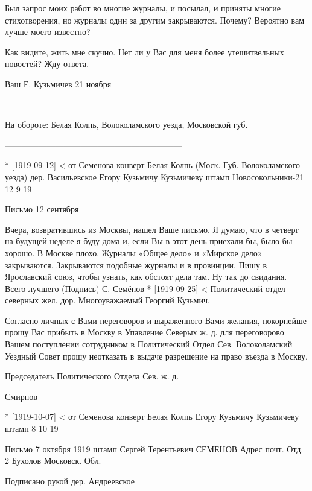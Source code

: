 Был запрос моих работ во многие журналы, и посылал, и приняты многие стихотворения, но журналы один за другим закрываются. Почему? Вероятно вам лучше моего известно?

Как видите, жить мне скучно. Нет ли у Вас для меня более утешитвельных новостей? Жду ответа.

Ваш Е. Кузьмичев 21 ноября

-

На обороте: Белая Колпь, Волоколамского уезда, Московской губ.

---------------------------------------------------------------

* [1919-09-12] < от Семенова
конверт 
Белая Колпь
(Моск. Губ. Волоколамского уезда)
дер. Васильевское
Егору Кузьмичу Кузьмичеву
штамп 
Новосокольники-21
12  9  19

Письмо
12 сентября

Вчера, возвратившись из Москвы, нашел Ваше письмо. Я думаю, что в четверг на будущей неделе я буду дома и, если Вы в этот день приехали бы, было бы хорошо.
В Москве плохо. Журналы «Общее дело» и «Мирское дело» закрываются. Закрываются подобные журналы и в провинции. Пишу в Ярославский союз, чтобы узнать, как обстоят дела там.
Ну так до свидания.
Всего лучшего
(Подпись) С. Семёнов
* [1919-09-25] < Политический отдел северных жел. дор.
Многоуважаемый Георгий Кузьмич.

Согласно личных с Вами переговоров и выраженного Вами желания, покорнейше прошу Вас прибыть в Москву в Упавление Северых ж. д. для переговорово Вашем поступлении сотрудником в Политический Отдел Сев.
Волоколамский Уездный Совет прошу неотказать в выдаче разрешение на право въезда в Москву.

Председатель Политического Отдела Сев. ж. д.

Смирнов

* [1919-10-07] < от Семенова
конверт
Белая Колпь
Егору Кузьмичу Кузьмичеву
штамп 
8  10  19

Письмо
7 октября 1919
штамп
Сергей Терентьевич СЕМЕНОВ
Адрес почт. Отд. 2 Бухолов Московск. Обл.

 Подписано рукой дер. Андреевское

